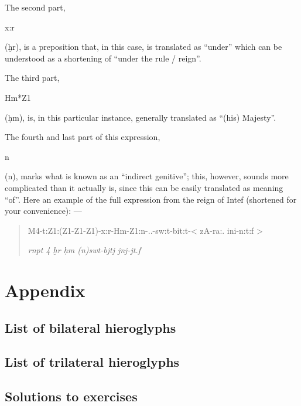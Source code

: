 \documentclass[a5paper,twoside,11pt]{report}
\newcommand{\xHiero}{ḫ}
\newcommand{\HHiero}{ḥ}
\begin{document}
			The second part, \begin{hieroglyph}x:r\end{hieroglyph} (ḫr), is a preposition that, in this case, is translated as “under” which can be understood as a shortening of “under the rule / reign”.

			The third part, \begin{hieroglyph}Hm*Z1\end{hieroglyph} (ḥm), is, in this particular instance, generally translated as “(his) Majesty”.

			The fourth and last part of this expression, \begin{hieroglyph}n\end{hieroglyph} (n), marks what is known as an “indirect genitive”; this, however, sounds more complicated than it actually is, since this can be easily translated as meaning “of”.
			Here an example of the full expression from the reign of Intef (shortened for your convenience): —

			\begin{quote}
				\begin{hieroglyph}
					M4-t:Z1:(Z1-Z1-Z1)-x:r-Hm-Z1:n-..-sw:t-bit:t-< zA-\!\!ra:. ini-n:t:f >
				\end{hieroglyph}
				\newline
				\textit{rnpt 4 \xHiero r \HHiero m (n)swt-bjtj jnj-jt.f}
			\end{quote}





	\part*{Appendix}
  \chapter*{List of bilateral hieroglyphs}
    \label{bitri}

  \chapter*{List of trilateral hieroglyphs}
    \newpage

  \chapter*{Solutions to exercises}
    \label{solutions}
    \newpage

		\newpage
		\printbibliography
\end{document}
